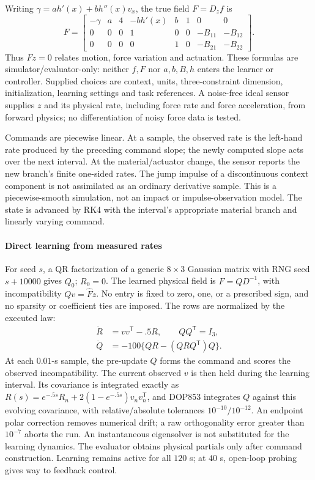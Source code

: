 Writing $\gamma=a h'(x)+b h''(x)v_x$, the true field $F=D_zf$ is
\begin{equation}
 F=\begin{bmatrix}
 -\gamma&a&4&-b h'(x)&b&1&0&0\\
 0&0&0&1&0&0&-B_{11}&-B_{12}\\
 0&0&0&0&1&0&-B_{21}&-B_{22}
 \end{bmatrix}.
 \label{eq:direct_contact_true_field}
\end{equation}
Thus $F\dot z=0$ relates motion, force variation and actuation. These formulas
are simulator/evaluator-only: neither $f,F$ nor $a,b,B,h$ enters the learner or
controller. Supplied choices are context, units, three-constraint dimension,
initialization, learning settings and task references. A noise-free ideal
sensor supplies $z$ and its physical rate, including force rate and force
acceleration, from forward physics; no differentiation of noisy force data
is tested.

Commands are piecewise linear. At a sample, the observed rate is the left-hand
rate produced by the preceding command slope; the newly computed slope acts
over the next interval. At the material/actuator change, the sensor reports
the new branch's finite one-sided rates. The jump impulse of a discontinuous
context component is not assimilated as an ordinary derivative sample.
This is a piecewise-smooth simulation, not an impact or impulse-observation
model. The state is advanced by RK4 with the interval's appropriate material
branch and linearly varying command.

\paragraph{Direct learning from measured rates}
For seed $s$, a QR factorization of a generic $8\times3$ Gaussian matrix with
RNG seed $s+10000$ gives $Q_0$; $R_0=0$. The learned physical field is
$\widehat F=QD^{-1}$, with incompatibility $Qv=\widehat F\dot z$.
No entry is fixed to zero, one, or a prescribed sign, and no sparsity or
coefficient ties are imposed. The rows are normalized by the executed law:
\begin{align}
 \dot R&=vv^{\mathsf T}-.5R,\qquad QQ^{\mathsf T}=I_3,\nonumber\\
 \dot Q&=-100\{QR-(QRQ^{\mathsf T})Q\}.
 \label{eq:direct_contact_law}
\end{align}
At each $0.01$-s sample, the pre-update $Q$ forms the command and scores the
observed incompatibility. The current observed $v$ is then held during the
learning interval. Its covariance is integrated exactly as
$R(s)=e^{-.5s}R_n+2(1-e^{-.5s})v_nv_n^{\mathsf T}$, and DOP853 integrates
$Q$ against this evolving covariance, with relative/absolute tolerances
$10^{-10}/10^{-12}$. An endpoint polar correction removes numerical drift;
a raw orthogonality error greater than $10^{-7}$ aborts the run. An
instantaneous eigensolver is not substituted for the learning dynamics.
The evaluator obtains physical partials only after command construction.
Learning remains active for all $120$ s; at $40$ s, open-loop probing gives
way to feedback control.

